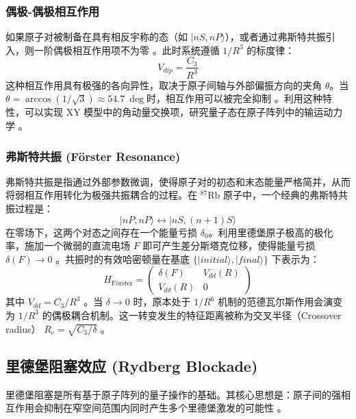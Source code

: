 \documentclass[../main.tex]{subfiles}
\begin{document}
\subsubsection{偶极-偶极相互作用}

如果原子对被制备在具有相反宇称的态（如 $|nS, nP\rangle$），或者通过弗斯特共振引入，则一阶偶极相互作用项不为零 。此时系统遵循 $1/R^3$ 的标度律：
\begin{equation}
V_{dip} = \frac{C_3}{R^3}
\end{equation}
这种相互作用具有极强的各向异性，取决于原子间轴与外部偏振方向的夹角 $\theta$。当 $\theta = \arccos(1/\sqrt{3}) \approx \SI{54.7}{\deg}$时，相互作用可以被完全抑制 。利用这种特性，可以实现 XY 模型中的角动量交换项，研究量子态在原子阵列中的输运动力学 。

\subsubsection{弗斯特共振 (F\"{o}rster Resonance)}

弗斯特共振是指通过外部参数微调，使得原子对的初态和末态能量严格简并，从而将弱相互作用转化为极强共振耦合的过程。在 $^{87}\text{Rb}$ 原子中，一个经典的弗斯特共振过程是：
\begin{equation}
|nP, nP\rangle \leftrightarrow |nS, (n+1)S\rangle
\end{equation}
在零场下，这两个对态之间存在一个能量亏损 $\delta_0$。利用里德堡原子极高的极化率，施加一个微弱的直流电场 $F$ 即可产生差分斯塔克位移，使得能量亏损 $\delta(F) \to 0$ 。共振时的有效哈密顿量在基底 $\{|initial\rangle, |final\rangle\}$ 下表示为：\begin{equation}
H_{\text{F\"{o}rster}} = \begin{pmatrix} \delta(F) & V_{dd}(R) \\ V_{dd}(R) & 0 \end{pmatrix}
\end{equation}
其中 $V_{dd} = C_3/R^3$ 。当 $\delta \to 0$ 时，原本处于 $1/R^6$ 机制的范德瓦尔斯作用会演变为 $1/R^3$ 的偶极耦合机制。这一转变发生的特征距离被称为交叉半径（Crossover radius） $R_c = \sqrt{C_3/\delta}$ 。


\subsection{里德堡阻塞效应 (Rydberg Blockade)}

里德堡阻塞是所有基于原子阵列的量子操作的基础。其核心思想是：原子间的强相互作用会抑制在窄空间范围内同时产生多个里德堡激发的可能性 。
\end{document}

